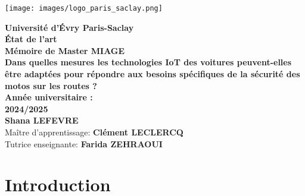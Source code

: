 \documentclass{article}
\begin{document}
\begin{titlepage}
    \begin{center}
    \texttt{[image: images/logo\_paris\_saclay.png]} 

        {\Large \textbf{Université d'Évry Paris-Saclay}}\\[0.5cm]
        {\huge \textbf{État de l'art}}\\[2cm]
        {\Large \textbf{Mémoire de Master MIAGE}}\\[2cm]

        {\huge \textbf{Dans quelles mesures les technologies IoT des voitures peuvent-elles être adaptées pour répondre aux besoins spécifiques de la sécurité des motos sur les routes ? }}\\[1cm]
        {\Large\textbf{Année universitaire :}} \\[0.5cm]
        {\Large \textbf{2024/2025}}\\[1cm]
                {\Large \textbf{Shana LEFEVRE}}\\[2cm]
                {\Large Maître d'apprentissage: \textbf{Clément LECLERCQ}}\\[0.5cm]
                {\Large Tutrice enseignante: \textbf{Farida ZEHRAOUI}}\\[0.5cm]
                \begin{figure}[h]
    \centering
\end{figure}
    \end{center}
\end{titlepage}

\tableofcontents %
\newpage

\newpage
\section{Introduction}
\end{document}

